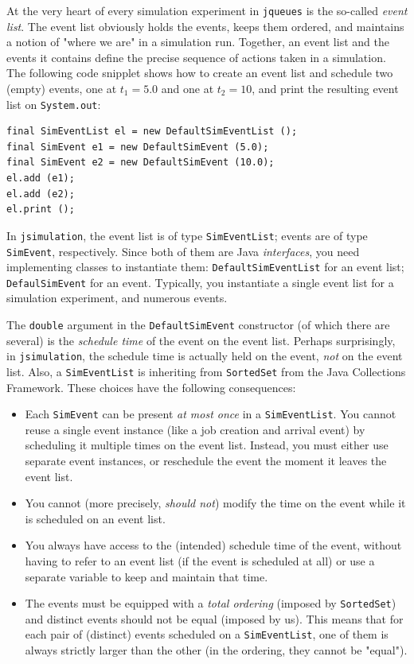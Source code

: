 \documentclass[12pt]{book}
\begin{document}
At the very heart of every simulation experiment
  in \lstinline{jqueues}
  is the so-called {\em event list}.
The event list obviously holds the events,
  keeps them ordered,
  and maintains a notion of "where we are" in a simulation run.
Together, an event list and the events it contains define
  the precise sequence of actions taken in a simulation.
The following code snipplet shows how to create an event list and
  schedule two (empty) events, one at $t_{1}=5.0$ and one at $t_{2}=10$,
  and print the resulting event list on \lstinline{System.out}:
\begin{lstlisting}
final SimEventList el = new DefaultSimEventList ();
final SimEvent e1 = new DefaultSimEvent (5.0);
final SimEvent e2 = new DefaultSimEvent (10.0);
el.add (e1);
el.add (e2);
el.print ();
\end{lstlisting}
In \lstinline{jsimulation},
  the event list is of type \lstinline{SimEventList};
  events are of type \lstinline{SimEvent},
  respectively.
Since both of them are Java {\em interfaces}, you need implementing classes
  to instantiate them: \lstinline{DefaultSimEventList} for an event list;
  \lstinline{DefaulSimEvent} for an event.
Typically,
  you instantiate a single event list for a simulation experiment,
  and numerous events.

The \lstinline{double} argument in the \lstinline{DefaultSimEvent} constructor
  (of which there are several)
  is the {\em schedule time\/} of the event on the event list.
Perhaps surprisingly,
  in \lstinline{jsimulation},
  the schedule time is actually held on the event,
 {\em not\/} on the event list.
Also, a \lstinline{SimEventList} is inheriting from \lstinline{SortedSet}
  from the Java Collections Framework.
These choices have the following consequences:
\begin{itemize}
  \item Each \lstinline{SimEvent} can be present {\em at most once\/} in a \lstinline{SimEventList}.
        You cannot reuse a single event instance (like a job creation and arrival event)
          by scheduling it multiple times on the event list.
        Instead, you must either use separate event instances, or reschedule the event
          the moment it leaves the event list.
  \item You cannot (more precisely, {\em should not\/}) modify the time on the event while it is
          scheduled on an event list.
  \item You always have access to the (intended) schedule time of the event, without having to
          refer to an event list (if the event is scheduled at all) or use a separate
          variable to keep and maintain that time.
  \item The events must be equipped with a {\em total ordering\/} (imposed by \lstinline{SortedSet})
          and distinct events should not be equal (imposed by us).
          This means that for each pair of (distinct) events scheduled on a \lstinline{SimEventList},
          one of them is always strictly larger than the other
          (in the ordering, they cannot be "equal").
\end{itemize}
\end{document}
